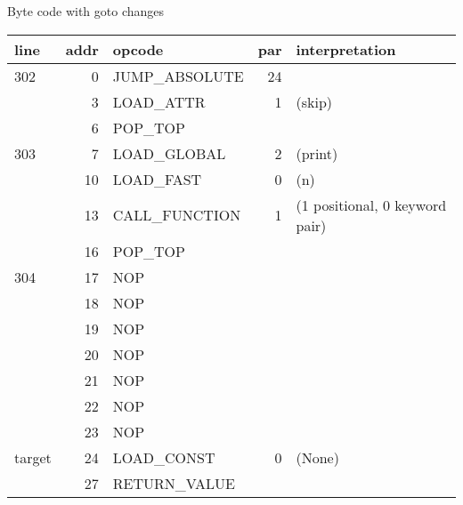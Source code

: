 \documentclass{beamer}
\begin{document}
\begin{frame}[fragile]{Byte code with goto changes}
\begin{tabular}{l|r|l|r|l}
line & addr & opcode & par & interpretation \\
\hline
302 &          0 & JUMP\_ABSOLUTE         &     24 &  \\
     &           3 &  LOAD\_ATTR               &   1  & (skip)  \\
      &          6 &  POP\_TOP      &  &           \\
\hline
303   &          7 &  LOAD\_GLOBAL         &       2  & (print)  \\
          &     10 &  LOAD\_FAST           &       0 &  (n)  \\
              & 13 &  CALL\_FUNCTION        &      1  & (1 positional, 0 keyword pair)  \\
     &          16 &  POP\_TOP            &     &  \\
\hline
304   &         17 &  NOP        &          &   \\
      &         18 &  NOP        &          &   \\
      &         19 &  NOP        &          &   \\
      &         20 &  NOP        &          &   \\
      &         21 &  NOP        &          &   \\
      &         22 &  NOP        &          &   \\
      &         23 &  NOP        &          &   \\
target     &          24 &  LOAD\_CONST         &        0  & (None)  \\
     &          27 &  RETURN\_VALUE      &      &  \\
\end{tabular}
\end{frame}
\end{document}
